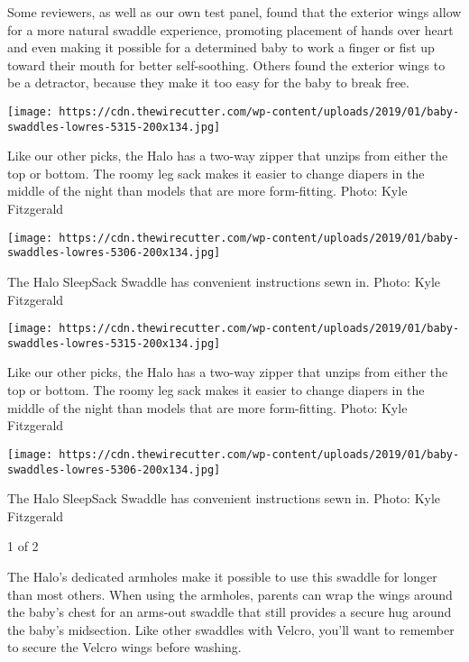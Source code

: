 Some reviewers, as well as our own test panel, found that the exterior
wings allow for a more natural swaddle experience, promoting placement
of hands over heart and even making it possible for a determined baby to
work a finger or fist up toward their mouth for better self-soothing.
Others found the exterior wings to be a detractor, because they make it
too easy for the baby to break free.

\texttt{[image: https://cdn.thewirecutter.com/wp-content/uploads/2019/01/baby-swaddles-lowres-5315-200x134.jpg]}

Like our other picks, the Halo has a two-way zipper that unzips from
either the top or bottom. The roomy leg sack makes it easier to change
diapers in the middle of the night than models that are more
form-fitting. Photo: Kyle Fitzgerald

\texttt{[image: https://cdn.thewirecutter.com/wp-content/uploads/2019/01/baby-swaddles-lowres-5306-200x134.jpg]}

The Halo SleepSack Swaddle has convenient instructions sewn in. Photo:
Kyle Fitzgerald

\texttt{[image: https://cdn.thewirecutter.com/wp-content/uploads/2019/01/baby-swaddles-lowres-5315-200x134.jpg]}

Like our other picks, the Halo has a two-way zipper that unzips from
either the top or bottom. The roomy leg sack makes it easier to change
diapers in the middle of the night than models that are more
form-fitting. Photo: Kyle Fitzgerald

\texttt{[image: https://cdn.thewirecutter.com/wp-content/uploads/2019/01/baby-swaddles-lowres-5306-200x134.jpg]}

The Halo SleepSack Swaddle has convenient instructions sewn in. Photo:
Kyle Fitzgerald

1 of 2

The Halo's dedicated armholes make it possible to use this swaddle for
longer than most others. When using the armholes, parents can wrap the
wings around the baby's chest for an arms-out swaddle that still
provides a secure hug around the baby's midsection. Like other swaddles
with Velcro, you'll want to remember to secure the Velcro wings before
washing.

